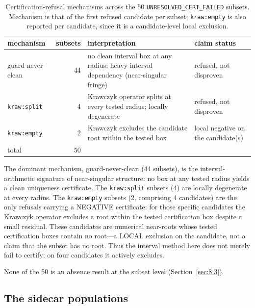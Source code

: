 \documentclass[pdflatex,sn-mathphys-num]{sn-jnl}
\begin{document}
\begin{table}[htbp]
\centering
\caption{Certification-refusal mechanisms across the 50 \texttt{UNRESOLVED\_CERT\_FAILED} subsets.
Mechanism is that of the first refused candidate per subset; \texttt{kraw:empty} is also reported
per candidate, since it is a candidate-level local exclusion.}
\label{tab:refusals}
\scriptsize
\begin{tabular}{@{}p{2.1cm}r>{\raggedright\arraybackslash}p{3.5cm}>{\raggedright\arraybackslash}p{2.35cm}@{}}\hline
mechanism & subsets & interpretation & claim status \\\hline
guard-never-clean & 44 & no clean interval box at any radius; heavy interval dependency (near-singular fringe) & refused, not disproven \\
\texttt{kraw:split} & 4 & Krawczyk operator splits at every tested radius; locally degenerate & refused, not disproven \\
\texttt{kraw:empty} & 2 & Krawczyk excludes the candidate root within the tested box & local negative on the candidate(s) \\\hline
total & 50 & \multicolumn{2}{>{\raggedright\arraybackslash}p{5.85cm}@{}}{candidates tested: 91; \texttt{kraw:empty} at candidate level: 4 candidates} \\\hline
\end{tabular}
\end{table}

The dominant mechanism, guard-never-clean (44 subsets), is the interval-arithmetic signature of near-singular structure: no box at any tested radius yields a clean uniqueness certificate. The \texttt{kraw:split} subsets (4) are locally degenerate at every radius. The \texttt{kraw:empty} subsets (2, comprising 4 candidates) are the only refusals carrying a NEGATIVE certificate: for those specific candidates the Krawczyk operator excludes a root within the tested certification box despite a small residual. These candidates are numerical near-roots whose tested certification boxes contain no root---a LOCAL exclusion on the candidate, not a claim that the subset has no root. Thus the interval method here does not merely fail to certify; on four candidates it actively excludes.

None of the 50 is an absence result at the subset level (Section~\ref{sec:8.3}).

\subsection{The sidecar populations}\label{sec:7.2}
\end{document}
